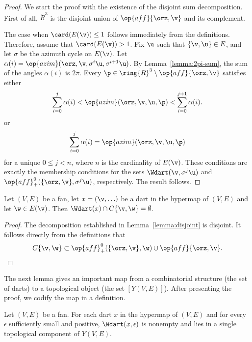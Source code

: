 \begin{proof}
We start the proof with the existence of the disjoint sum decomposition.
First of all, $\ring{R}^3$ is the disjoint union of $\op{aff}\{\orz,\v\}$
and its complement.

The case when $\card(E(\v))\le 1$ follows immediately from the
definitions.  Therefore, assume that $\card(E(\v)) >1$.  Fix $\u$ such
that $\{\v,\u\}\in E$, and let $\sigma$ be the azimuth cycle on
$E(\v)$.  Let $\alpha(i)=\op{azim}(\orz,\v,\sigma^i
\u,\sigma^{i+1}\u)$.  By Lemma~\ref{lemma:2pi-sum}, the sum of the
angles $\alpha(i)$ is $2\pi$.  Every
$\p\in\ring{R}^3\setminus\op{aff}\{\orz,\v\}$ satisfies either
\begin{displaymath}
\sum_{i=0}^j \alpha(i) <
\op{azim}(\orz,\v,\u,\p) < \sum_{i=0}^{j+1} \alpha(i).
\end{displaymath}
or 
\begin{displaymath}
\sum_{i=0}^j \alpha(i) = \op{azim}(\orz,\v,\u,\p)
\end{displaymath}
for a unique $0 \le j < n$, where $n$ is the cardinality of $E(\v)$. 
These conditions are exactly the membership conditions for the sets
$
\Wdart(\v,\sigma^j \u)
$
and $\op{aff}_+^0(\{\orz,\v\},\sigma^j \u)$, respectively.
The result follows.
\end{proof}

\begin{corollary}[disjointness]\label{cor:W}
  Let $(V,E)$ be a fan, let $x = (\v,\ldots)$ be a dart in the
  hypermap of $(V,E)$ and let $\w\in E(\v)$.  Then $\Wdart(x)\cap
  C\{\v,\w\}=\emptyset$.
\end{corollary}

\begin{proof} The decomposition established in
  Lemma~\ref{lemma:disjoint} is disjoint.  It follows directly from
  the definitions that
\begin{displaymath}C\{\v,\w\}\subset \op{aff}_+^0(\{\orz,\v\},\w) \cup 
\op{aff}\{\orz,\v\}.\end{displaymath}
\end{proof}

The next lemma gives an important map from a combinatorial structure (the
set of darts) to a topological object  (the set $[Y(V,E)]$).  After presenting the
proof, we  codify the map in a definition.

\begin{lemma} 
Let $(V,E)$ be a fan.
For each dart $x$ in the hypermap of $(V,E)$
and for every $\epsilon$ sufficiently small and positive,
$\Wdart(x,\epsilon)$ is nonempty and lies in a single 
topological component of $Y(V,E)$.
\end{lemma}
%
%


